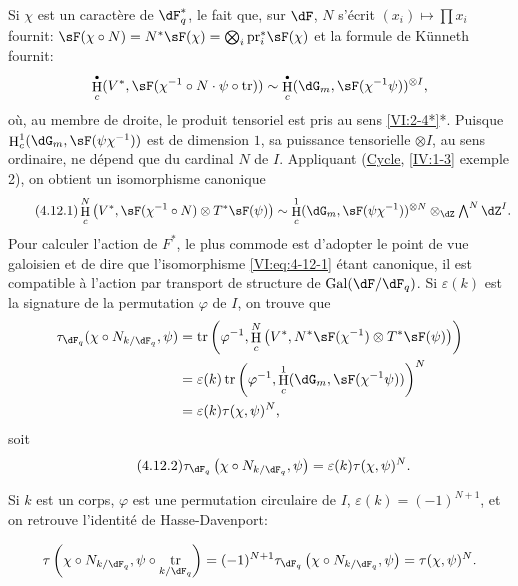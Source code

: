 \documentclass[oneside]{book}
\DeclareMathOperator{\gal}{Gal}
\DeclareMathOperator{\h}{H}
\DeclareMathOperator{\tr}{tr}
\newcommand{\pr}{\mathrm{pr}} %
\theoremstyle{sga-source}
\theoremstyle{sga-source-dash}
\theoremstyle{sga-source-dotdash}
\theoremstyle{sga-source-number-note-dash}
\theoremstyle{sga-source-note-number-dotdash}
\theoremstyle{sga-source-example-dotdash}
\theoremstyle{sga-source-inline-number}
\theoremstyle{sga-source-bare-number}
\theoremstyle{sga-source}
\let\oldbullet\bullet
\renewcommand{\bullet}{\textnormal{\tiny$\oldbullet$}}
\newcommand{\PrintPage}[1]{}\newcommand{\MathPage}[1]{}\newcommand{\PrintCite}[2]{#1}\newcommand{\var}[3]{#2}
\begin{document}
Si $\chi$ est un caractère de $\dF_q^\ast$, le fait que, sur $\dF$, $N$ 
s'écrit $(x_i)\mapsto \prod x_i$ fournit: 
$\sF(\chi\circ N)=\var{N^\ast\sF(\chi) = \bigotimes_i \pr_i^\ast\sF(\psi)}{N^\ast\sF(\chi) = \bigotimes_i \pr_i^\ast\sF(\chi)}{S45-SOL-0830}$ 
et la formule de K\"unneth fournit: 
\[
  \h_c^\bullet(V^\ast,\sF(\chi^{-1}\circ N\cdot \psi\circ \tr)) \sim \h_c^\bullet(\dG_m,\sF(\chi^{-1}\psi))^{\otimes I} \text{,} 
\]
où, au membre de droite, le produit tensoriel est pris au sens 
\ref{VI:2-4*}*. Puisque $\h_c^1(\dG_m,\sF(\psi\chi^{-1}))$ est de dimension 
$1$, sa puissance tensorielle $\otimes I$, au sens ordinaire, ne dépend que 
\var{du cardinal $n$ de $I$}{du cardinal $N$ de $I$}{S45-SOL-0832}. Appliquant (\hyperref[IV]{Cycle}, \ref{IV:1-3} exemple 
2), on obtient un isomorphisme canonique 
\begin{equation*}\tag{4.12.1}\label{VI:eq:4-12-1}
  \var{\h_c^N\left(V,}{\h_c^N\left(V^\ast,}{S45-SOL-0833}\sF(\chi^{-1}\circ N)\otimes T^\ast \sF(\psi)\right) \sim \var{\h_c^1(\dG_m,\sF(\psi\chi^{-1})) \otimes_\dZ}{\h_c^1(\dG_m,\sF(\psi\chi^{-1}))^{\otimes N} \otimes_\dZ}{S45-SOL-0834} \textstyle \bigwedge^N \dZ^I \text{.}
\end{equation*}
Pour calculer l'action de $F^\ast$, le plus commode est d'adopter le point de 
vue galoisien et de dire que l'isomorphisme \eqref{VI:eq:4-12-1} étant 
canonique, il est compatible à l'action par transport de structure de 
$\gal(\dF/\dF_q)$. Si $\varepsilon(k)$ est la signature de la permutation 
$\varphi$ de $I$, on trouve que 
\begin{align*} 
  \tau_{\dF_q}(\chi\circ N_{k/\dF_q},\psi) 
    &= \tr\left(\varphi^{-1},\h_c^N\left(V^\ast,N^\ast\sF(\chi^{-1})\otimes T^\ast \sF(\psi)\right)\right) \\ 
    &= \varepsilon(k) \tr\left(\varphi^{-1},\h_c^1(\dG_m,\sF(\chi^{-1}\psi))\right)^N \\
    &= \varepsilon(k) \tau(\chi,\psi)^N \text{,} 
\end{align*}
soit 
\begin{equation*}\tag{4.12.2}\label{VI:eq:4-12-2}
  \tau_{\dF_q}\left(\chi\circ N_{k/\dF_q},\psi\right) = \varepsilon(k) \tau(\chi,\psi)^N \text{.} 
\end{equation*}

Si $k$ est un corps, $\varphi$ est une permutation circulaire de $I$, 
$\varepsilon(k) = (-1)^{N+1}$, et on retrouve l'identité de Hasse-Davenport: 
\PrintPage{203}
\[
  \tau\left(\chi\circ N_{k/\dF_q},\psi\circ \tr_{k/\dF_q}\right) = (-1)^{N+1} \tau_{\dF_q}\left(\chi\circ N_{k/\dF_q},\psi\right) = \tau(\chi,\psi)^N \text{.} 
\]
\end{document}
